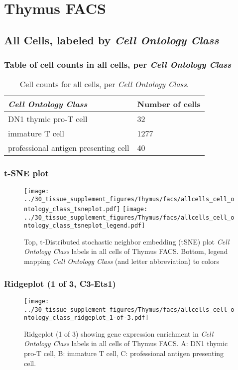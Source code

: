 \clearpage
\section{Thymus FACS}

\subsection{All Cells, labeled by \emph{Cell Ontology Class}}
\subsubsection{Table of cell counts in all cells, per \emph{Cell Ontology Class}}\begin{table}[h]
\centering
\label{my-label}
\begin{tabular}{@{}ll@{}}
\toprule

\emph{Cell Ontology Class}& Number of cells \\ \midrule
DN1 thymic pro-T cell & 32 \\

immature T cell & 1277 \\

professional antigen presenting cell & 40 \\
\bottomrule
\end{tabular}
\caption{Cell counts for all cells, per \emph{Cell Ontology Class}.}
\end{table}

\clearpage
\subsubsection{t-SNE plot}
\begin{figure}[h]
\centering
\texttt{[image: ../30\_tissue\_supplement\_figures/Thymus/facs/allcells\_cell\_ontology\_class\_tsneplot.pdf]}
\texttt{[image: ../30\_tissue\_supplement\_figures/Thymus/facs/allcells\_cell\_ontology\_class\_tsneplot\_legend.pdf]}
\caption{Top, t-Distributed stochastic neighbor embedding (tSNE) plot  \emph{Cell Ontology Class} labels in all cells of Thymus FACS. Bottom, legend mapping \emph{Cell Ontology Class} (and letter abbreviation) to colors}
\end{figure}


\clearpage

\subsubsection{Ridgeplot (1 of 3, C3-Ets1)}
\begin{figure}[h]
\centering
\texttt{[image: ../30\_tissue\_supplement\_figures/Thymus/facs/allcells\_cell\_ontology\_class\_ridgeplot\_1-of-3.pdf]}

\caption{ Ridgeplot (1 of 3)  showing gene expression enrichment in \emph{Cell Ontology Class} labels in all cells of Thymus FACS. A: DN1 thymic pro-T cell, B: immature T cell, C: professional antigen presenting cell.}
\end{figure}



